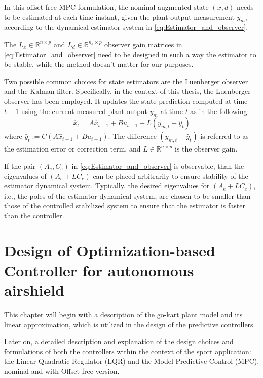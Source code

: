 \documentclass[a4paper,12pt,oneside]{book}
\begin{document}
In this offset-free MPC formulation, the nominal augmented state $(x,d)$ needs to be estimated at each time instant, given the plant output measurement $y_m$, according to the dynamical estimator system in \eqref{eq:Estimator_and_observer}.

The $L_x \in \mathbb{R}^{n \times p}$ and $L_d \in \mathbb{R}^{n_d \times p} $ observer gain matrices in \eqref{eq:Estimator_and_observer} need to be designed in such a way the estimator to be stable, while the method doesn't matter for our purposes.

\bigskip
Two possible common choices for state estimators are the Luenberger observer and the Kalman filter. 
Specifically, in the context of this thesis, the Luenberger observer has been employed.
It updates the state prediction computed at time $t-1$ using the current measured plant output $y_m$ at time $t$ as in the following:
\begin{equation}
    \hat{x}_t = A \hat{x}_{t-1} + B u_{t-1} + L (y_{m,t} - \hat{y}_t)
\end{equation}
where $\hat{y}_t := C(A \hat{x}_{t-1} + B u_{t-1})$.
The difference $(y_{m,t} - \hat{y}_t)$ is referred to as the estimation error or correction term, and $L \in \mathbb{R}^{n \times p}$ is the observer gain.

\bigskip
If the pair $(A_e,C_e)$ in \eqref{eq:Estimator_and_observer} is observable, than the eigenvalues of $(A_e+LC_e)$ can be placed arbitrarily to ensure stability of the estimator dynamical system.
Typically, the desired eigenvalues for $(A_e+LC_e)$, i.e., the poles of the estimator dynamical system, are chosen to be smaller than those of the controlled stabilized system to ensure that the estimator is faster than the controller.

\chapter{Design of Optimization-based Controller for autonomous airshield}
\label{chapter:Control_design}
This chapter will begin with a description of the go-kart plant model and its linear approximation, which is utilized in the design of the predictive controllers. 

Later on, a detailed description and explanation of the design choices and formulations of both the controllers within the context of the sport application: the Linear Quadratic Regulator (LQR) and the Model Predictive Control (MPC), nominal and with Offset-free version.
\end{document}

